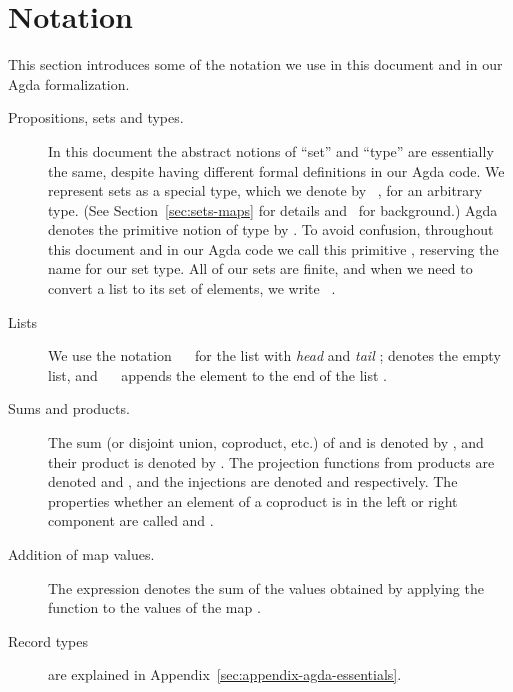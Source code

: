 \section{Notation}
\label{sec:notation}
This section introduces some of the notation we use in this document and in our Agda formalization.

\begin{description}
\item[Propositions, sets and types.] In this document the abstract notions of ``set''
and ``type'' are essentially the same, despite having different formal definitions
in our Agda code. We represent sets as a special type, which we denote by
~, for  an arbitrary type.
(See Section~\ref{sec:sets-maps} for details and~\cite[Chapter 19]{NPS:1990-open} for
background.)
Agda denotes the primitive notion of type by .  To avoid confusion,
throughout this document and in our Agda code we call this primitive \Type{},
reserving the name  for our set type.
All of our sets are finite, and when we need to convert
a list  to its set of elements, we write \fromList{}~.
\item[Lists] We use the notation ~~ for
  the list with \textit{head}  and \textit{tail} ;
  \AgdaInductiveConstructor{[]} denotes the empty list, and
  ~~ appends the element 
  to the end of the list .
\item[Sums and products.] The sum (or disjoint union, coproduct, etc.) of  and
   is denoted by  \coproduct{} , and their product
  is denoted by  \agdatimes{} . The projection functions from products
  are denoted \fst{} and \snd{}, and the injections are denoted \inl{} and \inr{} respectively. The
  properties whether an element of a coproduct is in the left or right component are called
  \isInl{} and \isInr{}.
\item[Addition of map values.] The expression
\AgdaFunction{∑[}\AgdaSpace{}%
\AgdaSpace{}%
\AgdaSpace{}%
\AgdaSpace{}%
\AgdaFunction{]}\AgdaSpace{}%
\AgdaSpace{}%
denotes the sum of the values obtained by applying the function  to the values
of the map .
\item[Record types] are explained in Appendix~\ref{sec:appendix-agda-essentials}.

\end{description}
